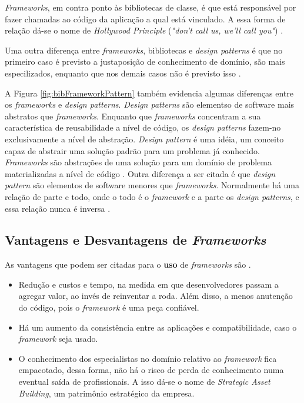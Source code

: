 \par
\indent \textit{Frameworks}, em contra ponto às bibliotecas de classe, é que está responsável por fazer chamadas ao código da aplicação a qual está vinculado. A essa forma de relação dá-se o nome de \textit{Hollywood Principle} (\textit{"don't call us, we'll call you"}) \cite{sauve2006}.
\par
\indent Uma outra diferença entre \textit{frameworks}, bibliotecas e \textit{design patterns} é que no  primeiro caso é previsto a justaposição de conhecimento de domínio, são mais especilizados, enquanto que nos demais casos não é previsto isso \cite{sauve2006}.
\par
\indent A Figura \ref{fig:bibFrameworkPattern} também evidencia algumas diferenças entre os \textit{frameworks} e \textit{design patterns}. \textit{Design patterns} são elementso de software mais abstratos que \textit{frameworks}. Enquanto que \textit{frameworks} concentram a sua característica de reusabilidade a nível de código, os \textit{design patterns} fazem-no exclusivamente a nível de abstração. \textit{Design pattern} é uma idéia, um conceito capaz de abstrair uma solução padrão para um problema já conhecido. \textit{Frameworks} são abstrações de uma solução para um domínio de problema materializadas a nível de código \cite{sauve2006}. Outra diferença a ser citada é que \textit{design pattern} são elementos de software menores que \textit{frameworks}. Normalmente há uma relação de parte e todo, onde o todo é o \textit{framework} e a parte os \textit{design patterns}, e essa relação nunca é inversa \cite{sauve2006}.

\subsection{Vantagens e Desvantagens de \textit{Frameworks}}
As vantagens que podem ser citadas para o \textbf{uso} de \textit{frameworks} são \cite{barretoJunior2006} \cite{sauve2006}.
\begin{itemize}
\item Redução e custos e tempo, na medida em que desenvolvedores passam a agregar valor, ao invés de reinventar a roda. Além disso, a menos anutenção do código, pois o \textit{framework} é uma peça confiável.
\item Há um aumento da consistência entre as aplicações e compatibilidade, caso o \textit{framework} seja usado.
\item O conhecimento dos especialistas no domínio relativo ao \textit{framework} fica empacotado, dessa forma, não há o risco de perda de conhecimento numa eventual saída de profissionais. A isso dá-se o nome de \textit{Strategic Asset Building}, um patrimônio estratégico da empresa.
\end{itemize}

